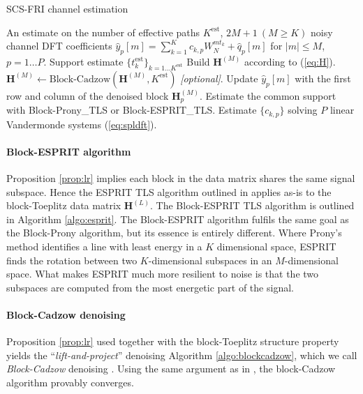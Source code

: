 \documentclass[journal,10pt]{IEEEtran}
\providecommand{\mat}[1]{\boldsymbol{#1}}
\begin{document}
\begin{algorithm}[h!]
\caption{SCS-FRI channel estimation}
\begin{algorithmic}[1]
\REQUIRE An estimate on the number of effective paths $K^{\text{est}}$, $2M+1\ (M\geq K)$ noisy channel DFT coefficients $\widehat y_p[m]=\sum_{k=1}^K c_{k,p}W_N^{mt_k}+ \widehat q_p[m]$ for $|m|\leq M$, $p=1\dots P$.
\ENSURE  Support estimate $\lbrace t_k^{\text{est}}\rbrace_{k=1\dots K^{\text{est}}}$
\STATE Build $\mat H^{(M)}$ according to (\ref{eq:H}).
\STATE $\mat H^{(M)}\leftarrow \text{Block-Cadzow}(\mat H^{(M)},K^{\text{est}})$ \emph{[optional]}.
\STATE Update $\widehat y_p[m]$ with the first row and column of the denoised block $\mat H_p^{(M)}$.
\STATE Estimate the common support with Block-Prony\_TLS or Block-ESPRIT\_TLS.
\STATE Estimate $\lbrace c_{k,p}\rbrace$  solving $P$ linear Vandermonde systems (\ref{eq:spldft}).
\end{algorithmic}\label{algo:csfri}
\end{algorithm}
\paragraph{Block-ESPRIT algorithm} 
Proposition \ref{prop:lr} implies each block in the data matrix shares the same signal subspace. Hence the ESPRIT TLS algorithm outlined in \cite{Roy1989} applies as-is to the block-Toeplitz data matrix $\mat H^{(L)}$. The Block-ESPRIT TLS algorithm is outlined in Algorithm \ref{algo:esprit}.
 The Block-ESPRIT algorithm fulfils the same goal as the Block-Prony algorithm, but its essence is entirely different. Where Prony's method identifies a line with least energy in a $K$ dimensional space, ESPRIT finds the rotation between two $K$-dimensional subspaces in an $M$-dimensional space. What makes ESPRIT much more resilient to noise is that the two subspaces are computed from the most energetic part of the signal.


\paragraph{Block-Cadzow denoising} 
Proposition \ref{prop:lr} used together with the block-Toeplitz structure property yields the ``\emph{lift-and-project}'' denoising Algorithm \ref{algo:blockcadzow}, which we call  \emph{Block-Cadzow} denoising \cite{Hormati2010}. Using the same argument as in \cite{Cadzow1988}, the block-Cadzow algorithm provably converges. 
\end{document}
